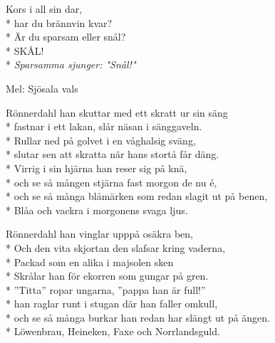 \begin{SongText}
\begin{SongVerse}
        \hrulefill%

        \hrulefill%

        \hrulefill%

        \hrulefill%

        \hrulefill%

        \hrulefill%

        \hrulefill%

        \hrulefill%
    \end{SongVerse}
\end{SongText}
\begin{SongText}[Hyfsvisa]
    \begin{SongVerse}
        Kors i all sin dar,\\*%
        har du brännvin kvar?\\*%
        Är du sparsam eller snål?\\*%
        SKÅL!\\*%
        \emph{Sparsamma sjunger: "Snål!"}
    \end{SongVerse}
\end{SongText}
\begin{SongText}[Rönnerdahl]
    \begin{SongInfo}
        Mel: Sjösala vals
    \end{SongInfo}
    \begin{SongVerse}
        Rönnerdahl han skuttar med ett skratt ur sin säng\\*%
        fastnar i ett lakan, slår näsan i sänggaveln.\\*%
        Rullar ned på golvet i en våghalsig sväng,\\*%
        slutar sen att skratta när hans stortå får däng.\\*%
        Virrig i sin hjärna han reser sig på knä,\\*%
        och se så mången stjärna fast morgon de nu é,\\*%
        och se så många blåmärken som redan slagit ut på benen,\\*%
        Blåa och vackra i morgonens svaga ljus.
    \end{SongVerse}
    \begin{SongVerse}
        Rönnerdahl han vinglar upppå osäkra ben,\\*%
        Och den vita skjortan den slafsar kring vaderna,\\*%
        Packad som en alika i majsolen sken\\*%
        Skrålar han för ekorren som gungar på gren.\\*%
        ”Titta” ropar ungarna, ”pappa han är full!”\\*%
        han raglar runt i stugan där han faller omkull,\\*%
        och se så många burkar han redan har slängt ut på ängen.\\*%
        Löwenbrau, Heineken, Faxe och Norrlandsguld.
    \end{SongVerse}
\end{SongText}
